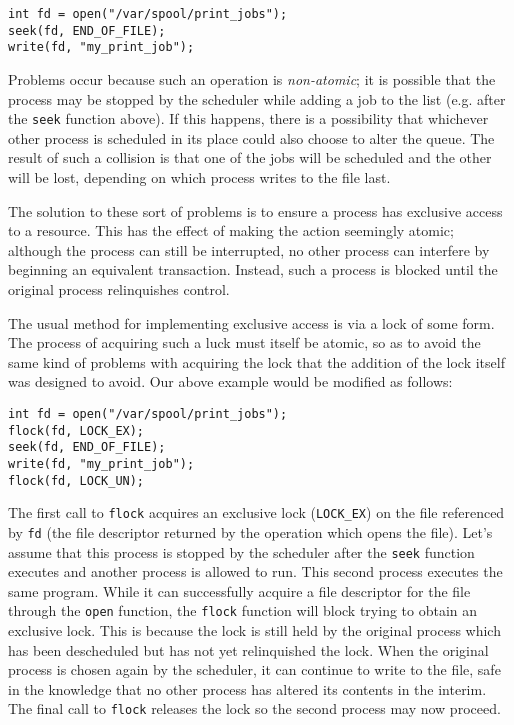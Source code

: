 \begin{verbatim}
int fd = open("/var/spool/print_jobs");
seek(fd, END_OF_FILE);
write(fd, "my_print_job");
\end{verbatim}

Problems occur because such an operation is \emph{non-atomic}; it is
possible that the process may be stopped by the scheduler while adding
a job to the list (e.g. after the \texttt{seek} function above).  If
this happens, there is a possibility that whichever other process is
scheduled in its place could also choose to alter the queue.  The
result of such a collision is that one of the jobs will be scheduled
and the other will be lost, depending on which process writes to the
file last.

The solution to these sort of problems is to ensure a process has
exclusive access to a resource.  This has the effect of making the
action seemingly atomic; although the process can still be
interrupted, no other process can interfere by beginning an equivalent
transaction.  Instead, such a process is blocked until the original
process relinquishes control.

The usual method for implementing exclusive access is via a lock of
some form.  The process of acquiring such a luck must itself be
atomic, so as to avoid the same kind of problems with acquiring the
lock that the addition of the lock itself was designed to avoid.  Our
above example would be modified as follows:

\begin{verbatim}
int fd = open("/var/spool/print_jobs");
flock(fd, LOCK_EX);
seek(fd, END_OF_FILE);
write(fd, "my_print_job");
flock(fd, LOCK_UN);
\end{verbatim}

The first call to \texttt{flock} acquires an exclusive lock
(\texttt{LOCK_EX}) on the file referenced by \texttt{fd} (the file
descriptor returned by the operation which opens the file).  Let's
assume that this process is stopped by the scheduler after the
\texttt{seek} function executes and another process is allowed to run.
This second process executes the same program.  While it can
successfully acquire a file descriptor for the file through the
\texttt{open} function, the \texttt{flock} function will block trying
to obtain an exclusive lock.  This is because the lock is still held
by the original process which has been descheduled but has not yet
relinquished the lock.  When the original process is chosen again by
the scheduler, it can continue to write to the file, safe in the
knowledge that no other process has altered its contents in the
interim.  The final call to \texttt{flock} releases the lock so the
second process may now proceed.

